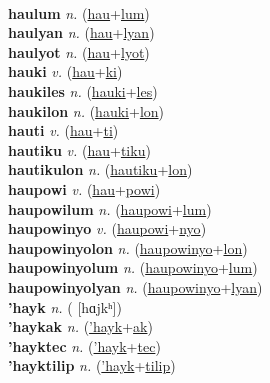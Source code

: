  \label{haulon} \\
\textbf{haulum} \textit{n.} (\hyperref[hau]{hau}+\hyperref[lum]{lum})
 \label{haulum} \\
\textbf{haulyan} \textit{n.} (\hyperref[hau]{hau}+\hyperref[lyan]{lyan})
 \label{haulyan} \\
\textbf{haulyot} \textit{n.} (\hyperref[hau]{hau}+\hyperref[lyot]{lyot})
 \label{haulyot} \\
\textbf{hauki} \textit{v.} (\hyperref[hau]{hau}+\hyperref[ki]{ki})
 \label{hauki} \\
\textbf{haukiles} \textit{n.} (\hyperref[hauki]{hauki}+\hyperref[les]{les})
 \label{haukiles} \\
\textbf{haukilon} \textit{n.} (\hyperref[hauki]{hauki}+\hyperref[lon]{lon})
 \label{haukilon} \\
\textbf{hauti} \textit{v.} (\hyperref[hau]{hau}+\hyperref[ti]{ti})
 \label{hauti} \\
\textbf{hautiku} \textit{v.} (\hyperref[hau]{hau}+\hyperref[tiku]{tiku})
 \label{hautiku} \\
\textbf{hautikulon} \textit{n.} (\hyperref[hautiku]{hautiku}+\hyperref[lon]{lon})
 \label{hautikulon} \\
\textbf{haupowi} \textit{v.} (\hyperref[hau]{hau}+\hyperref[powi]{powi})
 \label{haupowi} \\
\textbf{haupowilum} \textit{n.} (\hyperref[haupowi]{haupowi}+\hyperref[lum]{lum})
 \label{haupowilum} \\
\textbf{haupowinyo} \textit{v.} (\hyperref[haupowi]{haupowi}+\hyperref[nyo]{nyo})
 \label{haupowinyo} \\
\textbf{haupowinyolon} \textit{n.} (\hyperref[haupowinyo]{haupowinyo}+\hyperref[lon]{lon})
 \label{haupowinyolon} \\
\textbf{haupowinyolum} \textit{n.} (\hyperref[haupowinyo]{haupowinyo}+\hyperref[lum]{lum})
 \label{haupowinyolum} \\
\textbf{haupowinyolyan} \textit{n.} (\hyperref[haupowinyo]{haupowinyo}+\hyperref[lyan]{lyan})
 \label{haupowinyolyan} \\
\textbf{'hayk} \textit{n.} ( [hɑjkʰ])
 \label{'hayk} \\
\textbf{'haykak} \textit{n.} (\hyperref['hayk]{'hayk}+\hyperref[ak]{ak})
 \label{'haykak} \\
\textbf{'hayktec} \textit{n.} (\hyperref['hayk]{'hayk}+\hyperref[tec]{tec})
 \label{'hayktec} \\
\textbf{'hayktilip} \textit{n.} (\hyperref['hayk]{'hayk}+\hyperref[tilip]{tilip})
